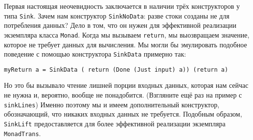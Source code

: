 Первая настоящая неочевидность заключается в наличии трёх конструкторов у
типа \lstinline=Sink=. Зачем нам конструктор \lstinline=SinkNoData=: разве стоки
созданы не для потребления данных? Дело в том, что он нужен для эффективной реализации 
экземпляра класса \lstinline=Monad=. Когда мы вызываем \lstinline=return=, мы
выозвращаем значение, которое не требует данных для вычисления. Мы могли бы эмулировать
подобное поведение с помощью конструктора \lstinline=SinkData= примерно так:
\begin{lstlisting}
myReturn a = SinkData ( return (Done (Just input) a)) (return a)
\end{lstlisting}
Но это бы вызывало чтение лишней порции входных данных, которая нам сейчас не нужна и,
вероятно, вообще не понадобится. (Взгляните ещё раз на пример с \lstinline=sinkLines=)
Именно поэтому мы и имеем дополнительный конструктор, обозначающий, что никаких входных данных не требуется.
Подобным образом, \lstinline=SinkLift= предоставляется для более эффективной реализации
экземпляра \lstinline=MonadTrans=.

